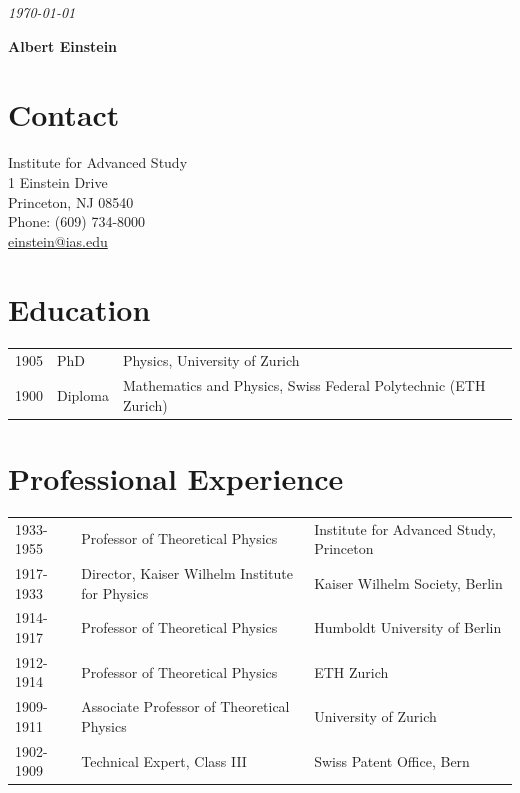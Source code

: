 \documentclass[martgin, line]{article}
\begin{document}
\begin{flushright}
  \textit{\today}
\end{flushright}



\begin{LARGE}
  \textbf{Albert Einstein}
\end{LARGE}

\section*{Contact}

Institute for Advanced Study\\
1 Einstein Drive\\
Princeton, NJ 08540\\
Phone: (609) 734-8000\\
\href{mailto:einstein@ias.edu}{einstein@ias.edu}\\


\section*{Education}
\noindent
\begin{tabular}{lll}
1905&PhD&
Physics,
University of Zurich\\
1900&Diploma&
Mathematics and Physics,
Swiss Federal Polytechnic (ETH Zurich)\\
\end{tabular}

\section*{Professional Experience}
\noindent
\begin{tabular}{lll}
1933-1955&
Professor of Theoretical Physics&
Institute for Advanced Study, Princeton\\
1917-1933&
Director, Kaiser Wilhelm Institute for Physics&
Kaiser Wilhelm Society, Berlin\\
1914-1917&
Professor of Theoretical Physics&
Humboldt University of Berlin\\
1912-1914&
Professor of Theoretical Physics&
ETH Zurich\\
1909-1911&
Associate Professor of Theoretical Physics&
University of Zurich\\
1902-1909&
Technical Expert, Class III&
Swiss Patent Office, Bern\\
\end{tabular}
\end{document}
